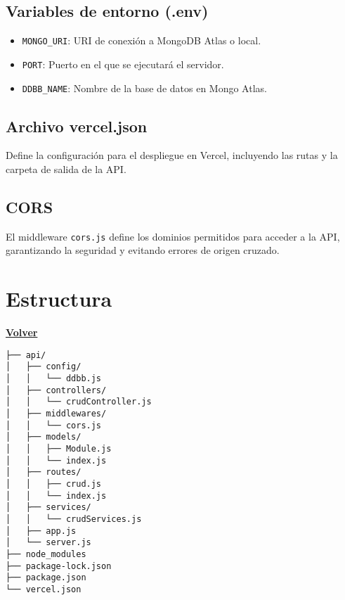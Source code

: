 \documentclass[a4paper,12pt]{article}
\begin{document}
\subsection{Variables de entorno (.env)}
\begin{itemize}
    \item \texttt{MONGO\_URI}: URI de conexión a MongoDB Atlas o local.
    \item \texttt{PORT}: Puerto en el que se ejecutará el servidor.
    \item \texttt{DDBB\_NAME}: Nombre de la base de datos en Mongo Atlas.
\end{itemize}

\subsection{Archivo vercel.json}
Define la configuración para el despliegue en Vercel, incluyendo las rutas y la carpeta de salida de la API.

\subsection{CORS}
El middleware \texttt{cors.js} define los dominios permitidos para acceder a la API, garantizando la seguridad y evitando errores de origen cruzado.

\clearpage

\section{Estructura}
\hyperlink{anchor-indice}{\textbf{Volver}}\\

\begin{verbatim}
├── api/
│   ├── config/
│   │   └── ddbb.js
│   ├── controllers/
│   │   └── crudController.js
│   ├── middlewares/
│   │   └── cors.js
│   ├── models/
│   │   ├── Module.js
│   │   └── index.js
│   ├── routes/
│   │   ├── crud.js
│   │   └── index.js
│   ├── services/
│   │   └── crudServices.js
│   ├── app.js
│   └── server.js
├── node_modules
├── package-lock.json
├── package.json
└── vercel.json
\end{verbatim}
\end{document}
